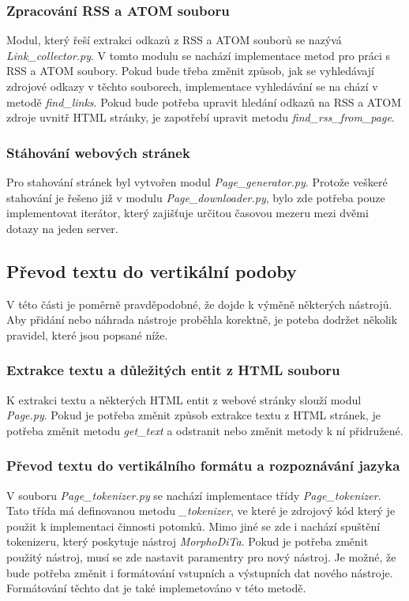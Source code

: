 \subsubsection{Zpracování RSS a ATOM souboru}
Modul, který řeší extrakci odkazů z RSS a ATOM souborů se nazývá \textit{Link\_collector.py}.
V tomto modulu se nachází implementace metod pro práci s RSS a ATOM soubory. Pokud bude
třeba změnit způsob, jak se vyhledávají zdrojové odkazy v těchto souborech, implementace vyhledávání
se na chází v metodě \textit{find\_links}. Pokud bude potřeba upravit hledání odkazů
na RSS a ATOM zdroje uvnitř HTML stránky, je zapotřebí upravit metodu \textit{find\_rss\_from\_page}.

\subsubsection{Stáhování webových stránek}
Pro stahování stránek byl vytvořen modul \textit{Page\_generator.py}. Protože veškeré
stahování je řešeno již v modulu \textit{Page\_downloader.py}, bylo zde potřeba pouze implementovat
iterátor, který zajišťuje určitou časovou mezeru mezi dvěmi dotazy na jeden server.

\subsection{Převod textu do vertikální podoby}
V této části je poměrně pravděpodobné, že dojde k výměně některých nástrojů.
Aby přidání nebo náhrada nástroje proběhla korektně, je poteba dodržet několik
pravidel, které jsou popsané níže.

\subsubsection{Extrakce textu a důležitých entit z HTML souboru}
K extrakci textu a některých HTML entit z webové stránky slouží modul \textit{Page.py}.
Pokud je potřeba změnit způsob extrakce textu z HTML stránek, je potřeba změnit
metodu \textit{get\_text} a odstranit nebo změnit metody k ní přidružené.

\subsubsection{Převod textu do vertikálního formátu a rozpoznávání jazyka}
V souboru \textit{Page\_tokenizer.py} se nachází implementace třídy \textit{Page\_tokenizer}.
Tato třída má definovanou metodu \textit{\_tokenizer}, ve které je zdrojový kód který
je použit k implementaci činnosti potomků. Mimo jiné se zde i nachází spuštění tokenizeru,
který poskytuje nástroj \textit{MorphoDiTa}. Pokud je potřeba změnit použitý nástroj,
musí se zde nastavit paramentry pro nový nástroj. Je možné, že bude potřeba změnit i formátování
vstupních a výstupních dat nového nástroje. Formátování těchto dat je také implemetováno v této
metodě.

